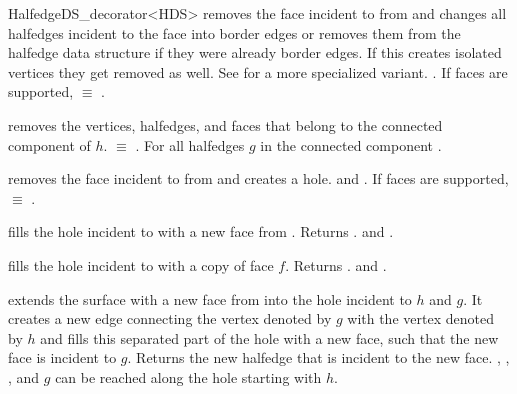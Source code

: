 \begin{ccRefClass}{HalfedgeDS_decorator<HDS>}
 {removes the
   face incident to  from  and changes all halfedges
   incident to the face into border edges or removes them from the
   halfedge data structure if they were already border edges. If this
   creates isolated vertices they get removed as well. See
    for a more specialized variant.  
   \ccPrecond {}. If faces are supported,
    $\equiv$ .}

    {removes the  vertices, halfedges, and faces that belong to the 
     connected component of $h$. \ccPrecond {} $\equiv$
     . For all halfedges $g$ in the 
     connected component .}



   {removes the face incident to  from  and creates a hole.
    \ccPrecond {} and . 
    If faces are supported,  $\equiv$ 
    .}

   {fills the hole incident to  with a new face from .
    Returns .
    \ccPrecond {} and .}

   {fills the hole incident to  with a copy of face $f$.
    Returns .
    \ccPrecond {} and .}

   {extends the surface with a new face from  into the hole 
    incident to $h$ and $g$. It creates a new edge connecting the vertex
    denoted by $g$ with the vertex denoted by $h$ and fills this separated 
    part of the hole with a new face, such that the new face is incident 
    to $g$. Returns the new halfedge that is incident to the new face.
    \ccPrecond {}, ,
    ,  and $g$ can be reached 
    along the hole starting with $h$.}


\end{ccRefClass}

